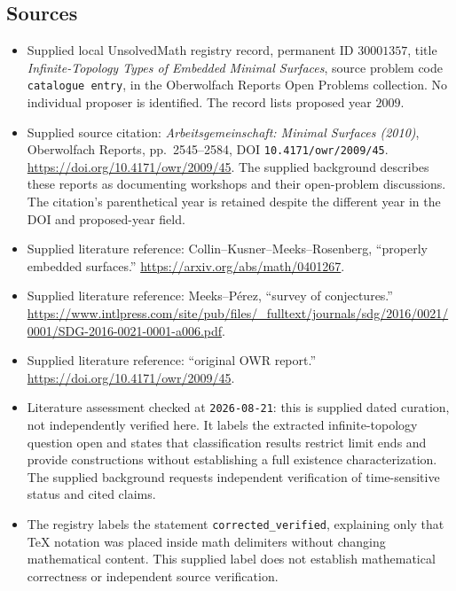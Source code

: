 \documentclass[11pt]{article}
\begin{document}
\subsection{Sources}
\begin{itemize}
\item Supplied local UnsolvedMath registry record, permanent ID \(30001357\), title \emph{Infinite-Topology Types of Embedded Minimal Surfaces}, source problem code \texttt{catalogue entry}, in the Oberwolfach Reports Open Problems collection. No individual proposer is identified. The record lists proposed year \(2009\).
\item Supplied source citation: \emph{Arbeitsgemeinschaft: Minimal Surfaces (2010)}, Oberwolfach Reports, pp.~2545--2584, DOI \texttt{10.4171/owr/2009/45}. \url{https://doi.org/10.4171/owr/2009/45}. The supplied background describes these reports as documenting workshops and their open-problem discussions. The citation's parenthetical year is retained despite the different year in the DOI and proposed-year field.
\item Supplied literature reference: Collin--Kusner--Meeks--Rosenberg, ``properly embedded surfaces.'' \url{https://arxiv.org/abs/math/0401267}.
\item Supplied literature reference: Meeks--P\'erez, ``survey of conjectures.'' \url{https://www.intlpress.com/site/pub/files/_fulltext/journals/sdg/2016/0021/0001/SDG-2016-0021-0001-a006.pdf}.
\item Supplied literature reference: ``original OWR report.'' \url{https://doi.org/10.4171/owr/2009/45}.
\item Literature assessment checked at \texttt{2026-08-21}: this is supplied dated curation, not independently verified here. It labels the extracted infinite-topology question open and states that classification results restrict limit ends and provide constructions without establishing a full existence characterization. The supplied background requests independent verification of time-sensitive status and cited claims.
\item The registry labels the statement \texttt{corrected\_verified}, explaining only that TeX notation was placed inside math delimiters without changing mathematical content. This supplied label does not establish mathematical correctness or independent source verification.
\end{itemize}
\end{document}
